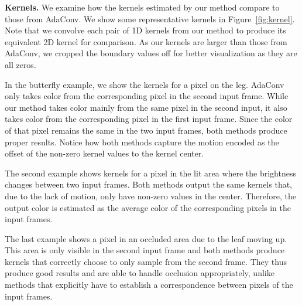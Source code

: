 \documentclass[10pt,twocolumn,letterpaper]{article}
\begin{document}
\noindent\textbf{Kernels.} We examine how the kernels estimated by our  method compare to those from AdaConv. We show some representative kernels in Figure~\ref{fig:kernel}. Note that we convolve each pair of 1D kernels from our method to produce its equivalent 2D kernel for comparison. As our kernels are larger than those from AdaConv, we cropped the boundary values off for better visualization as they are all zeros.

In the butterfly example, we show the kernels for a pixel on the leg. AdaConv only takes color from the corresponding pixel in the second input frame. While our method takes color mainly from the same pixel in the second input, it also takes color from the corresponding pixel in the first input frame. Since the color of that pixel remains the same in the two input frames, both methods produce proper results. Notice how both methods capture the motion encoded as the offset of the non-zero kernel values to the kernel center.

The second example shows kernels for a pixel in the lit area where the brightness changes between two input frames. Both methods output the same kernels that, due to the lack of motion, only have non-zero values in the center. Therefore, the output color is estimated as the average color of the corresponding pixels in the input frames.

The last example shows a pixel in an occluded area due to the leaf moving up. This area is only visible in the second input frame and both methods produce kernels that correctly choose to only sample from the second frame. They thus produce good results and are able to handle occlusion appropriately, unlike methods that explicitly have to establish a correspondence between pixels of the input frames.
\end{document}
